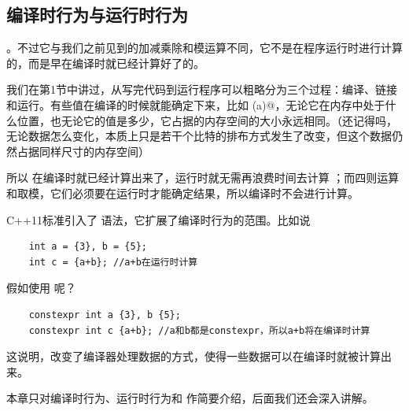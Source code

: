 \subsection*{编译时行为与运行时行为}
。不过它与我们之前见到的加减乘除和模运算不同，它不是在程序运行时进行计算的，而是早在编译时就已经计算好了的。\par
我们在第1节中讲过，从写完代码到运行程序可以粗略分为三个过程：编译、链接和运行。有些值在编译的时候就能确定下来，比如 \lstinline@sizeof (a)@，无论它在内存中处于什么位置，也无论它的值是多少，它占据的内存空间的大小永远相同。（还记得吗，无论数据怎么变化，本质上只是若干个比特的排布方式发生了改变，但这个数据仍然占据同样尺寸的内存空间）\par
所以 \lstinline@sizeof@ 在编译时就已经计算出来了，运行时就无需再浪费时间去计算 \lstinline@sizeof@；而四则运算和取模，它们必须要在运行时才能确定结果，所以编译时不会进行计算。\par
C++11标准引入了 \lstinline@constexpr@ 语法，它扩展了编译时行为的范围。比如说
\begin{lstlisting}
    int a = {3}, b = {5};
    int c = {a+b}; //a+b在运行时计算
\end{lstlisting}
假如使用 \lstinline@constexpr@ 呢？
\begin{lstlisting}
    constexpr int a {3}, b {5};
    constexpr int c {a+b}; //a和b都是constexpr，所以a+b将在编译时计算
\end{lstlisting}
这说明，\lstinline@constexpr@ 改变了编译器处理数据的方式，使得一些数据可以在编译时就被计算出来。\par
本章只对编译时行为、运行时行为和 \lstinline@constexpr@ 作简要介绍，后面我们还会深入讲解。\par
